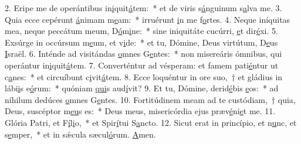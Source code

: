 2. Eripe me de operántibus in\uline{i}quit\uline{á}tem:~* et de viris s\uline{á}nguinum s\uline{a}lva me.
3. Quia ecce cepérunt \uline{á}nimam m\uline{e}am:~* irruérunt \uline{i}n me f\uline{o}rtes.
4. Neque iníquitas mea, neque peccátum meum, D\uline{ó}m\uline{i}ne:~* sine iniquitáte cucúrri, \uline{e}t dir\uline{é}xi.
5. Exsúrge in occúrsum m\uline{e}um, et v\uline{i}de:~* et tu, Dómine, Deus virtútum, D\uline{e}us \uline{I}sraël.
6. Inténde ad visitándas \uline{o}mnes G\uline{e}ntes:~* non misereáris ómnibus, qui operántur in\uline{i}quit\uline{á}tem.
7. Converténtur ad vésperam: et famem pati\uline{é}ntur ut c\uline{a}nes:~* et circuíbunt c\uline{i}vit\uline{á}tem.
8. Ecce loquéntur in ore suo,~† et gládius in lábi\uline{i}s e\uline{ó}rum:~* quóniam \uline{qui}s aud\uline{í}vit?
9. Et tu, Dómine, derid\uline{é}bis \uline{e}os:~* ad níhilum dedúces \uline{o}mnes G\uline{e}ntes.
10. Fortitúdinem meam ad te custódiam,~† quia, Deus, suscéptor m\uline{e}\uline{u}s es:~* Deus meus, misericórdia ejus præv\uline{é}ni\uline{e}t me.
11. Glória Patri, et F\uline{í}l\uline{i}o,~* et Spir\uline{í}tui S\uline{a}ncto.
12. Sicut erat in princípio, et n\uline{u}nc, et s\uline{e}mper,~* et in sǽcula sæcul\uline{ó}rum. \uline{A}men.
